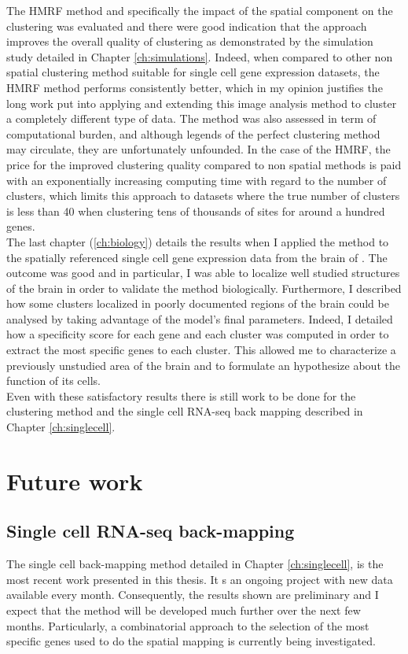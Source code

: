  The HMRF method and specifically the impact of the spatial component on the clustering was evaluated and there were good indication that the approach improves the overall quality of clustering as demonstrated by the simulation study detailed in Chapter \ref{ch:simulations}. Indeed, when compared to other non spatial clustering method suitable for single cell gene expression datasets, the HMRF method performs consistently better, which in my opinion justifies the long work put into applying and extending this image analysis method to cluster a completely different type of data. The method was also assessed in term of computational burden, and although legends of the perfect clustering method may circulate, they are unfortunately unfounded. In the case of the HMRF, the price for the improved clustering quality compared to non spatial methods is paid with an exponentially increasing computing time with regard to the number of clusters, which limits this approach to datasets where the true number of clusters is less than 40 when clustering tens of thousands of sites for around a hundred genes. \\
 
 The last chapter (\ref{ch:biology}) details the results when I applied the method to the spatially referenced single cell gene expression data from the brain of \platyfull{}. The outcome was good and in particular, I was able to localize well studied structures of the brain in order to validate the method biologically. Furthermore, I described how some clusters localized in poorly documented regions of the brain could be analysed by taking advantage of the model's final parameters. Indeed, I detailed how a specificity score for each gene and each cluster was computed in order to extract the most specific genes to each cluster. This allowed me to characterize a previously unstudied area of the brain and to formulate an hypothesize about the function of its cells. \\
 
  Even with these satisfactory results there is still work to be done for the clustering method and the single cell RNA-seq back mapping described in Chapter \ref{ch:singlecell}.\\
  
\section{Future work}


  \subsection{Single cell RNA-seq back-mapping}
  The single cell back-mapping method detailed in Chapter \ref{ch:singlecell}, is the most recent work presented in this thesis. It s an ongoing project with new data available every month. Consequently, the results shown are preliminary and I expect that the method will be developed much further over the next few months. Particularly, a combinatorial approach to the selection of the most specific genes used to do the spatial mapping is currently being investigated.
  
